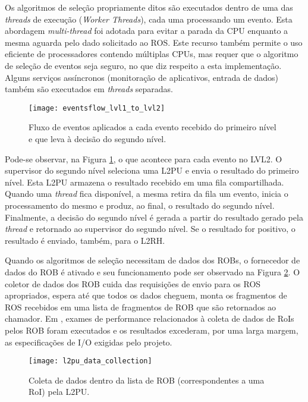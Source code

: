 Os algoritmos de seleção propriamente ditos são executados dentro de uma das \emph{threads} de execução (\emph{Worker Threads}), cada uma processando um evento. Esta abordagem \emph{multi-thread} foi adotada para evitar a parada da CPU enquanto a mesma aguarda pelo dado solicitado ao ROS. Este recurso também permite o uso eficiente de processadores contendo múltiplas CPUs, mas requer que o algoritmo de seleção de eventos seja seguro, no que diz respeito a esta implementação. Alguns serviços assíncronos (monitoração de aplicativos, entrada de dados) também são executados em \emph{threads} separadas.

\begin{figure}
\begin{center}
\texttt{[image: eventsflow\_lvl1\_to\_lvl2]}
\caption{Fluxo de eventos aplicados a cada evento recebido do primeiro nível e que leva à decisão do segundo nível.}
\label{fig:app_l2p}
\end{center}
\end{figure}

Pode-se observar, na Figura \ref{fig:app_l2p}, o que acontece para cada evento no LVL2. O supervisor do segundo nível seleciona uma L2PU e envia o resultado do primeiro nível. Esta L2PU armazena o resultado recebido em uma fila compartilhada. Quando uma \emph{thread} fica disponível, a mesma retira da fila um evento, inicia o processamento do mesmo e produz, ao final, o resultado do segundo nível. Finalmente, a decisão do segundo nível é gerada a partir do resultado gerado pela \emph{thread} e retornado ao supervisor do segundo nível. Se o resultado for positivo, o resultado é enviado, também, para o L2RH.


Quando os algoritmos de seleção necessitam de dados dos ROBs, o fornecedor de dados do ROB é ativado e seu funcionamento pode ser observado na Figura \ref{fig:l2pu_dc}. O coletor de dados dos ROB cuida das requisições de envio para os ROS apropriados, espera até que todos os dados cheguem, monta os fragmentos de ROS recebidos em uma lista de fragmentos de ROB que são retornados ao chamador. Em \cite{bib:tdaq_tdr}, exames de performance relacionados à coleta de dados de RoIs pelos ROB foram executados e os resultados excederam, por uma larga margem, as especificações de I/O exigidas pelo projeto.

\begin{figure}
\begin{center}
\texttt{[image: l2pu\_data\_collection]}
\caption{Coleta de dados dentro da lista de ROB (correspondentes a uma RoI) pela L2PU.}
\label{fig:l2pu_dc}
\end{center}
\end{figure}

